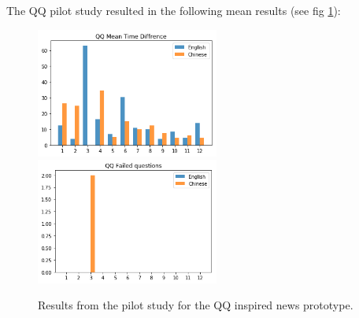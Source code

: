 \newpage
The QQ pilot study resulted in the following mean results (see fig \ref{fig:pilot_study_qq}):
\begin{figure}[h]
	\centering
	\includegraphics[width=60mm]{Images/pilot_study_qq_mean_time}
	\includegraphics[width=60mm]{Images/pilot_study_qq_failed}
	\decoRule
	\caption[QQ pilot study results]{Results from the pilot study for the QQ inspired news prototype.}
	\label{fig:pilot_study_qq}
\end{figure}

